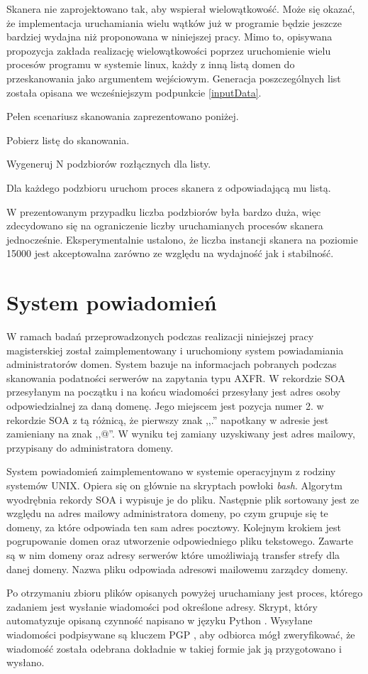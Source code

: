 Skanera nie zaprojektowano tak, aby wspierał wielowątkowość. Może się okazać, że implementacja uruchamiania wielu wątków już w programie
będzie jeszcze bardziej wydajna niż proponowana w niniejszej pracy. Mimo to, opisywana propozycja zakłada realizację wielowątkowości
poprzez uruchomienie wielu procesów programu w systemie linux, każdy z inną listą domen do przeskanowania jako argumentem wejściowym.
Generacja poszczególnych list została opisana we wcześniejszym podpunkcie \ref{inputData}.

Pełen scenariusz skanowania zaprezentowano poniżej.
\begin{eumerate}
	\item Pobierz listę do skanowania.
	\item Wygeneruj N podzbiorów rozłącznych dla listy.
	\item Dla każdego podzbioru uruchom proces skanera z odpowiadającą mu listą.
\end{eumerate}

W prezentowanym przypadku liczba podzbiorów była bardzo duża, więc zdecydowano się na ograniczenie liczby uruchamianych procesów
skanera jednocześnie. Eksperymentalnie ustalono, że liczba instancji skanera na poziomie 15000 jest akceptowalna zarówno ze względu
na wydajność jak i stabilność.

\section{System powiadomień}
W ramach badań przeprowadzonych podczas realizacji niniejszej pracy magisterskiej został zaimplementowany i uruchomiony system
powiadamiania administratorów domen. System bazuje na informacjach pobranych podczas skanowania podatności serwerów na zapytania
typu AXFR. W rekordzie SOA przesyłanym na początku i na końcu wiadomości przesyłany jest adres osoby odpowiedzialnej za daną domenę.
Jego miejscem jest pozycja numer 2. w rekordzie SOA z tą różnicą, że pierwszy znak ,,.'' napotkany w adresie jest zamieniany na
znak ,,@''. W wyniku tej zamiany uzyskiwany jest adres mailowy, przypisany do administratora domeny.

System powiadomień zaimplementowano w systemie operacyjnym z rodziny systemów UNIX. Opiera się on głównie na skryptach powłoki
\textit{bash}. Algorytm wyodrębnia rekordy SOA i wypisuje je do pliku. Następnie plik sortowany jest ze względu na adres mailowy
administratora domeny, po czym grupuje się te domeny, za które odpowiada ten sam adres pocztowy. Kolejnym krokiem jest pogrupowanie
domen oraz utworzenie odpowiedniego pliku tekstowego. Zawarte są w nim domeny oraz adresy serwerów które umożliwiają transfer
strefy dla danej domeny. Nazwa pliku odpowiada adresowi mailowemu zarządcy domeny.

Po otrzymaniu zbioru plików opisanych powyżej uruchamiany jest proces, którego zadaniem jest wysłanie wiadomości pod określone
adresy. Skrypt, który automatyzuje opisaną czynność napisano w języku Python \cite{python}. Wysyłane wiadomości podpisywane są
kluczem PGP \cite{RFC4880}, aby odbiorca mógł zweryfikować, że wiadomość została odebrana dokładnie w takiej formie jak ją przygotowano
i wysłano.
